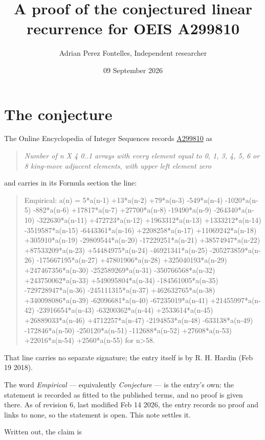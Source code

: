 \documentclass[11pt]{article}
\title{A proof of the conjectured linear recurrence for OEIS A299810}
\author{Adrian Perez Fontelles, Independent researcher}
\date{09 September 2026}
\theoremstyle{definition}
\begin{document}
\maketitle
\section{The conjecture}

The Online Encyclopedia of Integer Sequences records \href{https://oeis.org/A299810}{A299810} as

\begin{quote}\itshape Number of n X 4 0..1 arrays with every element equal to 0, 1, 3, 4, 5, 6 or 8 king-move adjacent elements, with upper left element zero\end{quote}

and carries in its Formula section the line:

\begin{quote}\ttfamily Empirical: a(n) = 5*a(n-1) +13*a(n-2) +79*a(n-3) -549*a(n-4) -1020*a(n-5) -882*a(n-6) +17817*a(n-7) +27700*a(n-8) -19490*a(n-9) -264340*a(n-10) -322630*a(n-11) +472723*a(n-12) +1963312*a(n-13) +1333212*a(n-14) -3519587*a(n-15) -6443361*a(n-16) +2208258*a(n-17) +11069242*a(n-18) +305910*a(n-19) -29809544*a(n-20) -17229251*a(n-21) +38574947*a(n-22) +87533209*a(n-23) +54484975*a(n-24) -46921341*a(n-25) -205273859*a(n-26) -175667195*a(n-27) +47801906*a(n-28) +325040193*a(n-29) +247467356*a(n-30) -252589269*a(n-31) -350766568*a(n-32) +243750062*a(n-33) +549095804*a(n-34) -184561005*a(n-35) -729728947*a(n-36) -245111315*a(n-37) +462632765*a(n-38) +340098086*a(n-39) -62096681*a(n-40) -67235019*a(n-41) +21455997*a(n-42) -23916654*a(n-43) -63200362*a(n-44) +2533614*a(n-45) +26889033*a(n-46) +4712257*a(n-47) -2194853*a(n-48) -633138*a(n-49) -172846*a(n-50) -250120*a(n-51) -112688*a(n-52) +27608*a(n-53) +22016*a(n-54) +2560*a(n-55) for n>58.\end{quote}

That line carries no separate signature; the entry itself is by R. H. Hardin (Feb 19 2018).

The word {\itshape Empirical} --- equivalently {\itshape Conjecture} --- is the entry's own: the statement is recorded as fitted to the published terms, and no proof is given there. As of revision 6, last modified Feb 14 2026, the entry records no proof and links to none, so the statement is open. This note settles it.

Written out, the claim is
\end{document}
